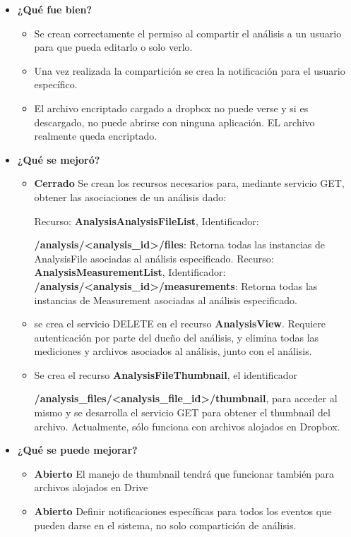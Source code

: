 	\begin{itemize}
		\item \textbf{¿Qué fue bien?}
        	\begin{itemize}
				\item Se crean correctamente el permiso al compartir el análisis a un usuario para que pueda editarlo o solo verlo.
				\item Una vez realizada la compartición se crea la notificación para el usuario específico.
				\item El archivo encriptado cargado a dropbox no puede verse y si es descargado, no puede abrirse con ninguna aplicación. EL archivo realmente queda encriptado.
			\end{itemize}

   		\item \textbf{¿Qué se mejoró?}
        	\begin{itemize}
                \item \textbf{Cerrado} Se crean los recursos necesarios para, mediante servicio GET, obtener las asociaciones de un análisis dado:
                
                    Recurso: \textbf{AnalysisAnalysisFileList}, Identificador: 
                    
                    \textbf{/analysis/<analysis\_id>/files}: Retorna todas las instancias de AnalysisFile asociadas al análisis especificado.
                    Recurso: \textbf{AnalysisMeasurementList}, Identificador: \textbf{/analysis/<analysis\_id>/measurements}: Retorna todas las instancias de Measurement asociadas al análisis especificado.
                
                \item se crea el servicio DELETE en el recurso \textbf{AnalysisView}. Requiere autenticación por parte del dueño del análisis, y elimina todas las mediciones y archivos asociados al análisis, junto con el análisis.
                
                \item Se crea el recurso \textbf{AnalysisFileThumbnail}, el identificador 
                
                \textbf{/analysis\_files/<analysis\_file\_id>/thumbnail}, para acceder al mismo y se desarrolla el servicio GET para obtener el thumbnail del archivo. Actualmente, sólo funciona con archivos alojados en Dropbox.
                
                
			\end{itemize}

   		\item \textbf{¿Qué se puede mejorar?}
        	\begin{itemize}
		        \item \textbf{Abierto} El manejo de thumbnail tendrá que funcionar también para archivos alojados en Drive
		        \item \textbf{Abierto} Definir notificaciones específicas para todos los eventos que pueden darse en el sistema, no solo compartición de análisis.
            \end{itemize}
        

	\end{itemize}
